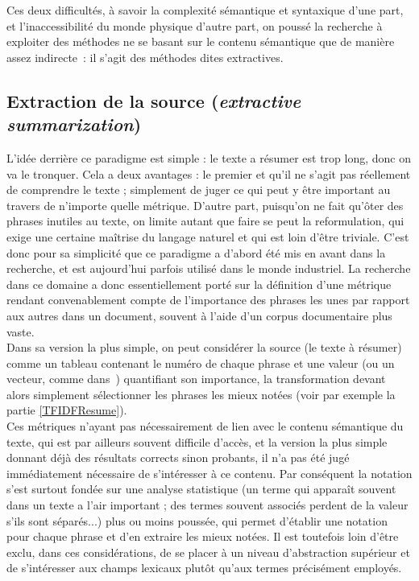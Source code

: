 \documentclass[a4paper, 12pt]{article}
\begin{document}
Ces deux difficultés, à savoir la complexité sémantique et syntaxique d'une part, et l'inaccessibilité du monde physique d'autre part, on poussé la recherche à exploiter des méthodes ne se basant sur le contenu sémantique que de manière assez indirecte~: il s'agit des méthodes dites extractives.


\subsection{Extraction de la source (\emph{extractive summarization})}

L'idée derrière ce paradigme est simple : le texte a résumer est trop long, donc on va le tronquer. Cela a deux avantages : le premier et qu'il ne s'agit pas réellement de comprendre le texte ; simplement de juger ce qui peut y être important au travers de n'importe quelle métrique. D'autre part, puisqu'on ne fait qu'ôter des phrases inutiles au texte, on limite autant que faire se peut la reformulation, qui exige une certaine maîtrise du langage naturel et qui est loin d'être triviale. C'est donc pour sa simplicité que ce paradigme a d'abord été mis en avant dans la recherche, et est aujourd'hui parfois utilisé dans le monde industriel. La recherche dans ce domaine a donc essentiellement porté sur la définition d'une métrique rendant convenablement compte de l'importance des phrases les unes par rapport aux autres dans un document, souvent à l'aide d'un corpus documentaire plus vaste.\\

Dans sa version la plus simple, on peut considérer la source (le texte à résumer) comme un tableau contenant le numéro de chaque phrase et une valeur (ou un vecteur, comme dans~\cite{fattah_ga_2009}) quantifiant son importance, la transformation devant alors simplement sélectionner les phrases les mieux notées (voir par exemple la partie \ref{TFIDFResume}). \\

Ces métriques n'ayant pas nécessairement de lien avec le contenu sémantique du texte, qui est par ailleurs souvent difficile d'accès, et la version la plus simple donnant déjà des résultats corrects sinon probants, il n'a pas été jugé immédiatement nécessaire de s'intéresser à ce contenu. Par conséquent la notation s'est surtout fondée sur une analyse statistique (un terme qui apparaît souvent dans un texte a l'air important ; des termes souvent associés perdent de la valeur s'ils sont séparés...) plus ou moins poussée, qui permet d'établir une notation pour chaque phrase et d'en extraire les mieux notées. Il est toutefois loin d'être exclu, dans ces considérations, de se placer à un niveau d'abstraction supérieur et de s'intéresser aux champs lexicaux plutôt qu'aux termes précisément employés.
\end{document}
